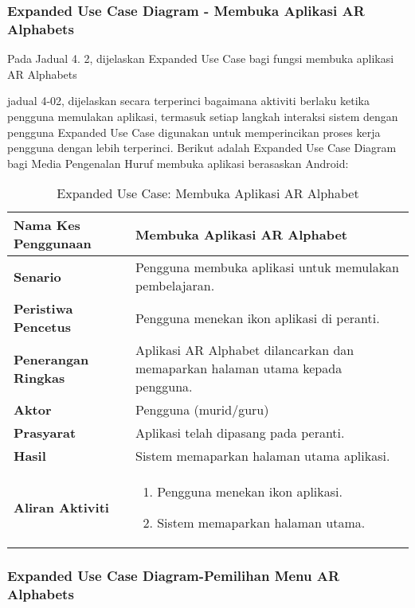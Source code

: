 \begin{itemize}
\begin{itemize}
\begin{itemize}
\begin{itemize}
\begin{itemize}
\begin{itemize}
\begin{itemize}
\begin{itemize}
\subsubsection{Expanded Use Case Diagram - Membuka Aplikasi AR Alphabets}
Pada   Jadual   4. 2,   dijelaskan   Expanded   Use   Case   bagi   fungsi membuka aplikasi AR Alphabets

\flushleft jadual 4-02,   dijelaskan   secara   terperinci   bagaimana    aktiviti   berlaku   ketika pengguna  memulakan   aplikasi,  termasuk   setiap  langkah  interaksi  sistem  dengan pengguna Expanded Use Case digunakan untuk memperincikan proses kerja pengguna dengan  lebih  terperinci.  Berikut  adalah  Expanded  Use  Case  Diagram  bagi  Media Pengenalan Huruf membuka aplikasi berasaskan Android:


\begin{table}[htbp]
\centering
\caption{Expanded Use Case: Membuka Aplikasi AR Alphabet}
\begin{tabular}{p{4cm}p{9cm}}
\toprule
\textbf{Nama Kes Penggunaan} & Membuka Aplikasi AR Alphabet \\
\midrule
\textbf{Senario} & Pengguna membuka aplikasi untuk memulakan pembelajaran. \\

\textbf{Peristiwa Pencetus} & Pengguna menekan ikon aplikasi di peranti. \\

\textbf{Penerangan Ringkas} & Aplikasi AR Alphabet dilancarkan dan memaparkan halaman utama kepada pengguna. \\

\textbf{Aktor} & Pengguna (murid/guru) \\

\textbf{Prasyarat} & Aplikasi telah dipasang pada peranti. \\

\textbf{Hasil} & Sistem memaparkan halaman utama aplikasi. \\

\textbf{Aliran Aktiviti} & 
\begin{enumerate}
    \item Pengguna menekan ikon aplikasi.
    \item Sistem memaparkan halaman utama.
\end{enumerate} \\ \bottomrule
\end{tabular}
\end{table}


\subsubsection{Expanded Use Case Diagram-Pemilihan  Menu  AR  Alphabets}


\end{itemize}
\end{itemize}
\end{itemize}
\end{itemize}
\end{itemize}
\end{itemize}
\end{itemize}
\end{itemize}
